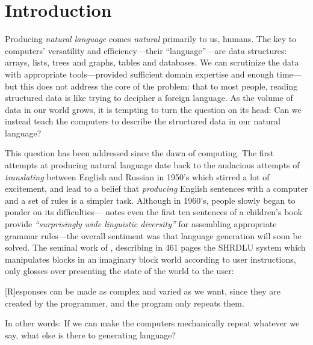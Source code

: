 \chapter{Introduction}
\label{chap:intro}
Producing \emph{natural language} comes \emph{natural} primarily to us, humans.
The key to computers' versatility and efficiency---their ``language''---are data structures: arrays, lists, trees and graphs, tables and databases.
We can scrutinize the data with appropriate tools---provided sufficient domain expertise and enough time---but this does not address the core of the problem: that to most people, reading structured data is like trying to decipher a foreign language. As the volume of data in our world grows, it is tempting to turn the question on its head: Can we instead teach the computers to describe the structured data in our natural language?


This question has been addressed since the dawn of computing. The first attempts at producing natural language date back to the audacious attempts of \emph{translating} between English and Russian in 1950's \cite{sheridan1955research} which stirred a lot of excitement, and lead to a belief that \emph{producing} English sentences with a computer and a set of rules is a simpler task. Although in 1960's, people slowly began to ponder on its difficulties---\citet{yngve1961random} notes even the first ten sentences of a children's book provide \emph{``surprisingly wide linguistic diversity''} for assembling appropriate grammar rules---the overall sentiment was that language generation will soon be solved. The seminal work of \citet{winograd1971procedures}, describing in 461 pages the SHRDLU system which manipulates blocks in an imaginary block world according to user instructions, only glosses over presenting the state of the world to the user:
\begin{pquotation}{\citealp[p.384]{winograd1971procedures}}
    [R]esponses can be made as complex and varied as we want, since they are created by the programmer, and the program only repeats them.
\end{pquotation}
In other words: If we can make the computers mechanically repeat whatever we say, what else is there to generating language?

